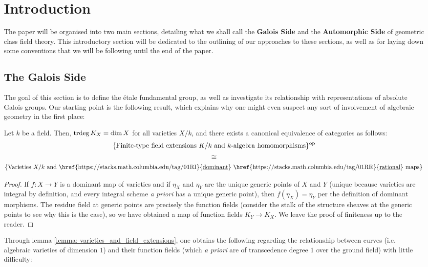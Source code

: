 \section{Introduction}
    The paper will be organised into two main sections, detailing what we shall call the \textbf{Galois Side} and the \textbf{Automorphic Side} of geometric class field theory. This introductory section will be dedicated to the outlining of our approaches to these sections, as well as for laying down some conventions that we will be following until the end of the paper.

    \subsection{The Galois Side}
        The goal of this section is to define the \'etale fundamental group, as well as investigate its relationship with representations of absolute Galois groups. Our starting point is the following result, which explains why one might even suspect any sort of involvement of algebraic geometry in the first place:
        \begin{lemma} \label{lemma: varieties_and_field_extensions}
            \cite[\href{https://stacks.math.columbia.edu/tag/0BXN}{Tag 0BXN}]{stacks} Let $k$ be a field. Then, $\operatorname{trdeg} K_X = \dim X$ for all varieties $X/k$, and there exists a canonical equivalence of categories as follows:
                $$\{\text{Finite-type field extensions $K/k$ and $k$-algebra homomorphisms}\}^{\mathrm{op}}$$
                $$\cong$$
                $$\{\text{Varieties $X/k$ and \href{https://stacks.math.columbia.edu/tag/01RI}{\underline{dominant}} \href{https://stacks.math.columbia.edu/tag/01RR}{\underline{rational}} maps}\}$$
        \end{lemma}
            \begin{proof}
                If $f: X \to Y$ is a dominant map of varieties and if $\eta_X$ and $\eta_Y$ are the unique generic points of $X$ and $Y$ (unique because varieties are integral by definition, and every integral scheme \textit{a priori} has a unique generic point), then $f(\eta_X) = \eta_Y$ per the definition of dominant morphisms. The residue field at generic points are precisely the function fields (consider the stalk of the structure sheaves at the generic points to see why this is the case), so we have obtained a map of function fields $K_Y \to K_X$. We leave the proof of finiteness up to the reader.
            \end{proof}
        Through lemma \ref{lemma: varieties_and_field_extensions}, one obtains the following regarding the relationship between curves (i.e. algebraic varieties of dimension $1$) and their function fields (which \textit{a priori} are of transcedence degree $1$ over the ground field) with little difficulty:
